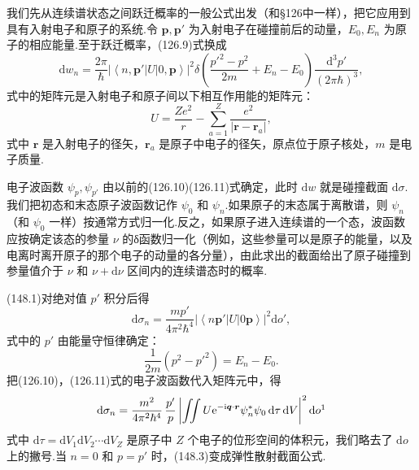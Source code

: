 我们先从连续谱状态之间跃迁概率的一般公式出发（和§126中一样），把它应用到具有入射电子和原子的系统.令 $\boldsymbol{p},\boldsymbol{p}'$ 为入射电子在碰撞前后的动量，$E_0,E_n$ 为原子的相应能量.至于跃迁概率，(126.9)式换成
\begin{equation}
  \mathrm{d}w_n=\frac{2\pi}{\hbar}
  \left|\left\langle n,\boldsymbol{p}'|U|0,\boldsymbol{p}\right\rangle\right|^2
  \delta\left(\frac{p'^2-p^2}{2m}+E_n-E_0\right)
  \frac{\mathrm{d}^3p'}{(2\pi\hbar)^3},
\end{equation}
式中的矩阵元是入射电子和原子间以下相互作用能的矩阵元：
\begin{equation*}
  U=\frac{Ze^2}{r}-\sum_{a=1}^{Z}\frac{e^2}{|\boldsymbol{r}-\boldsymbol{r}_a|},
\end{equation*}
式中 $\boldsymbol{r}$ 是入射电子的径矢，$\boldsymbol{r}_a$ 是原子中电子的径矢，原点位于原子核处，$m$ 是电子质量.

电子波函数 $\psi_p,\psi_{p'}$ 由以前的(126.10)(126.11)式确定，此时 $\mathrm{d}w$ 就是碰撞截面 $\mathrm{d}\sigma$.我们把初态和末态原子波函数记作 $\psi_0$ 和 $\psi_n$.如果原子的末态属于离散谱，则 $\psi_n$（和 $\psi_0$ 一样）按通常方式归一化.反之，如果原子进入连续谱的一个态，波函数应按确定该态的参量 $\nu$ 的δ函数归一化（例如，这些参量可以是原子的能量，以及电离时离开原子的那个电子的动量的各分量），由此求出的截面给出了原子碰撞到参量值介于 $\nu$ 和 $\nu+\mathrm{d}\nu$ 区间内的连续谱态时的概率.

(148.1)对绝对值 $p'$ 积分后得
\begin{equation*}
  \mathrm{d}\sigma_n=\frac{mp'}{4\pi^2\hbar^4}
  \left|\left\langle n\boldsymbol{p}'|U|0\boldsymbol{p}\right\rangle\right|^2\mathrm{d}o',
\end{equation*}
式中的 $p'$ 由能量守恒律确定：
\begin{equation}
  \frac{1}{2m}\left(p^2-p'^2\right)=E_n-E_0.
\end{equation}
把(126.10)，(126.11)式的电子波函数代入矩阵元中，得
\begin{equation}
  \mathrm{d}\sigma_n=\frac{m^2}{4\pi^2\hbar^4}\,\frac{p'}{p}
  \left|\iint U\mathrm{e}^{-\mathrm{i}\boldsymbol{q}\cdot\boldsymbol{r}}\psi_n^{*}\psi_0\,\mathrm{d}\tau\,\mathrm{d}V\right|^2\mathrm{d}o\footnotemark
\end{equation}
式中 $\mathrm{d}\tau=\mathrm{d}V_1\mathrm{d}V_2\cdots\mathrm{d}V_Z$ 是原子中 $Z$ 个电子的位形空间的体积元，我们略去了 $\mathrm{d}o$ 上的撇号.当 $n=0$ 和 $p=p'$ 时，(148.3)变成弹性散射截面公式.

